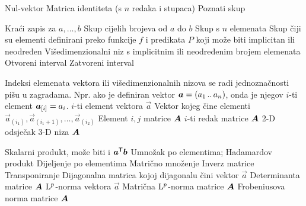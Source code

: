 					{Nul-vektor}
	{Matrica identiteta (s $n$ redaka i stupaca)}
			{Poznati skup}

 {Kraći zapis za $a,\dots, b$}
 {Skup cijelih brojeva od $a$ do $b$}
	{Skup s $n$ elemenata}
 {Skup čiji su elementi definirani preko funkcije $f$ i predikata $P$ koji može biti implicitan ili neodređen}
 {Višedimenzionalni niz s implicitnim ili neodređenim brojem elemenata}
			{Otvoreni interval}
			{Zatvoreni interval}

{Indeksi elemenata vektora ili višedimenzionalnih nizova se radi jednoznačnosti pišu u zagradama. Npr. ako je definiran vektor $\vec a=(a_1\bidot a_n)$, onda je njegov $i$-ti element $\vec a_{\sbr{i}}=a_i$.}
	{$i$-ti element vektora $\vec{a}$}
	{Vektor kojeg čine elementi $\vec{a}_{(i_1)}, \vec{a}_{(i_1+1)},\dots, \vec{a}_{(i_2)}$}
	{Element $i,j$ matrice $\mat A$}
	{$i$-ti redak matrice $\mat A$}
	{2-D odsječak 3-D niza $\mat A$}

 {Skalarni produkt, može biti i $\vec{a}^\transpose\vec{b}$}
	{Umnožak po elementima; Hadamardov produkt}
 {Dijeljenje po elementima}
		{Matrično množenje}
			{Inverz matrice}
	{Transponiranje}
		{Dijagonalna matrica kojoj dijagonalu čini vektor $\vec a$}
		{Determinanta matrice $\mat A$}
	{$\mathrm{L}^p$-norma vektora $\vec a$}
	{Matrična $\mathrm{L}^p$-norma matrice $\mat A$}
	{Frobeniusova norma matrice $\mat A$}

